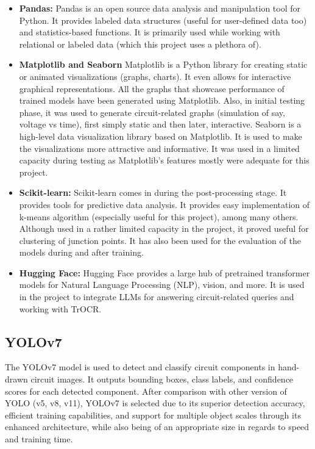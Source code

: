 \begin{itemize}
    \item \textbf{Pandas:} Pandas is an open source data analysis and manipulation tool for Python. It provides labeled data structures (useful for user-defined data too) and statistics-based functions. It is primarily used while working with relational or labeled data (which this project uses a plethora of). 
    
    \item \textbf{Matplotlib and Seaborn} Matplotlib is a Python library for creating static or animated visualizations (graphs, charts). It even allows for interactive graphical representations. All the graphs that showcase performance of trained models have been generated using Matplotlib. Also, in initial testing phase, it was used to generate circuit-related graphs (simulation of say, voltage vs time), first simply static and then later, interactive. Seaborn is a high-level data visualization library based on Matplotlib. It is used to make the visualizations more attractive and informative. It was used in a limited capacity during testing as Matplotlib's features mostly were adequate for this project.
    
    \item \textbf{Scikit-learn:} Scikit-learn comes in during the post-processing stage. It provides tools for predictive data analysis. It provides easy implementation of k-means algorithm (especially useful for this project), among many others. Although used in a rather limited capacity in the project, it proved useful for clustering of junction points. It has also been used for the evaluation of the models during and after training.
    
    \item \textbf{Hugging Face:} Hugging Face provides a large hub of pretrained transformer models for Natural Language Processing (NLP), vision, and more. It is used in the project to integrate LLMs for answering circuit-related queries and working with TrOCR.
    
\end{itemize}

\subsection{YOLOv7}

The YOLOv7 model is used to detect and classify circuit components in hand-drawn circuit images. It outputs bounding boxes, class labels, and confidence scores for each detected component. After comparison with other version of YOLO (v5, v8, v11), YOLOv7 is selected due to its superior detection accuracy, efficient training capabilities, and support for multiple object scales through its enhanced architecture, while also being of an appropriate size in regards to speed and training time.

